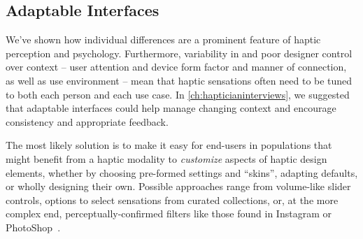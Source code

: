 \subsection{Adaptable Interfaces}
\label{sec:conclusion:adaptableinterfaces}
We've shown how individual differences are a prominent feature of haptic perception and psychology.
Furthermore,  variability in and poor designer control over context --  user attention and  device form factor and manner of connection, as well as use environment -- mean that haptic sensations often need to be tuned to both each person and each use case.
In \autoref{ch:hapticianinterviews}, we suggested that adaptable interfaces could help manage changing context and encourage consistency and appropriate feedback.

The most likely solution   is to make it easy for end-users in populations that might benefit from a haptic modality to \textit{customize} aspects of haptic design elements, whether by choosing pre-formed settings and ``skins'', adapting defaults, or wholly designing their own. 
Possible approaches range from volume-like slider controls, options to select sensations from curated collections, or, at the more complex end, perceptually-confirmed filters like those found in Instagram or PhotoShop~\cite{Seifi2014,Seifi2015,SchneiderAsiaHaptics2014}.


%
%
%






